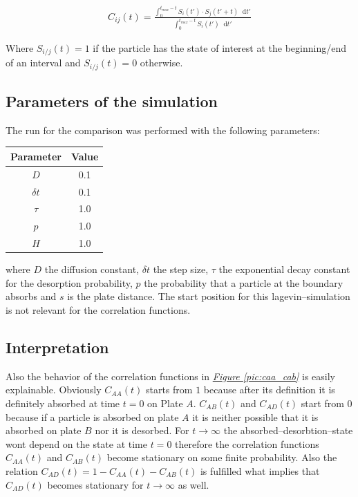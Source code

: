 \documentclass[a4paper, parskip=half]{scrartcl}
\newcommand{\diff}{\mathop{}\!\mathrm{d}}
\newcommand{\myFigRef}[1]{\textit{\hyperref[#1]{Figure \ref*{#1}}}}
\begin{document}
\begin{align}
  C_{ij}(t) = \frac{\int_0^{t_{max}-t} S_i(t') \cdot S_j(t' + t) \diff t'}{\int_0^{t_{max}-t} S_i(t') \diff t'}
\end{align}

Where $S_{i/j}(t) = 1$ if the particle has the state of interest at the beginning/end of an interval and $S_{i/j}(t) = 0$ otherwise.

\subsection{Parameters of the simulation}
The run for the comparison was performed with the following parameters:
\begin{center}
\begin{tabular}{c|c}
Parameter & Value \\\hline
$D$ & 0.1 \\
$\delta t$ & 0.1 \\
$\tau$ & 1.0 \\
$p$ & 1.0 \\
$H$ & 1.0
\end{tabular}
\end{center}

where $D$ the diffusion constant, $\delta t$ the step size, $\tau$ the exponential decay constant for the desorption probability, $p$ the probability that a particle at the boundary absorbs and $s$ is the plate distance. The start position for this lagevin--simulation is not relevant for the correlation functions. 

\subsection{Interpretation}

Also the behavior of the correlation functions in \myFigRef{pic:caa_cab} is easily explainable. Obviously $C_{AA}(t)$ starts from $1$ because after its definition it is definitely absorbed at time $t=0$ on Plate $A$. $C_{AB}(t)$ and $C_{AD}(t)$ start from $0$ because if a particle is absorbed on plate $A$ it is neither possible that it is absorbed on plate $B$ nor it is desorbed. For $t \rightarrow \infty$ the absorbed--desorbtion--state wont depend on the state at time $t = 0$ therefore the correlation functions $C_{AA}(t)$ and $C_{AB}(t)$ become stationary on some finite probability. Also the relation $C_{AD}(t) = 1 - C_{AA}(t) - C_{AB}(t)$ is fulfilled what implies that $C_{AD}(t)$ becomes stationary for $t \rightarrow \infty$ as well.
\end{document}
